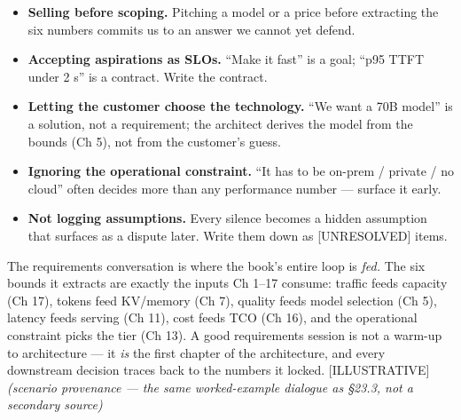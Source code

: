 \label{common-mistakes}


\begin{itemize}
\tightlist
\item
  \textbf{Selling before scoping.} Pitching a model or a price before
  extracting the six numbers commits us to an answer we cannot yet
  defend.
\item
  \textbf{Accepting aspirations as SLOs.} ``Make it fast'' is a goal;
  ``p95 TTFT under 2 s'' is a contract. Write the contract.
\item
  \textbf{Letting the customer choose the technology.} ``We want a 70B
  model'' is a solution, not a requirement; the architect derives the
  model from the bounds (Ch 5), not from the customer's guess.
\item
  \textbf{Ignoring the operational constraint.} ``It has to be on-prem /
  private / no cloud'' often decides more than any performance number
  --- surface it early.
\item
  \textbf{Not logging assumptions.} Every silence becomes a hidden
  assumption that surfaces as a dispute later. Write them down as
  \mbox{{[}UNRESOLVED{]}} items.
\end{itemize}

\label{architecture-consequence}


The requirements conversation is where the book's entire loop is
\emph{fed.} The six bounds it extracts are exactly the inputs Ch 1--17
consume: traffic feeds capacity (Ch 17), tokens feed KV/memory (Ch 7),
quality feeds model selection (Ch 5), latency feeds serving (Ch 11),
cost feeds TCO (Ch 16), and the operational constraint picks the tier
(Ch 13). A good requirements session is not a warm-up to architecture
--- it \emph{is} the first chapter of the architecture, and every
downstream decision traces back to the numbers it locked.
\mbox{{[}ILLUSTRATIVE{]}} \emph{(scenario provenance --- the same
worked-example dialogue as §23.3, not a secondary source)}

